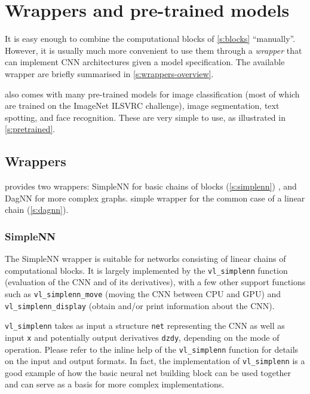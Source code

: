 \chapter{Wrappers and pre-trained models}\label{s:wrappers}

It is easy enough to combine the computational blocks of \autoref{s:blocks} ``manually''. However, it is usually much more convenient to use them through a \emph{wrapper} that can implement CNN architectures given a model specification. The available wrapper are briefly summarised in \autoref{s:wrappers-overview}.

\matconvnet also comes with many pre-trained models for image classification (most of which are trained on the ImageNet ILSVRC challenge), image segmentation, text spotting, and face recognition. These are very simple to use, as illustrated in \autoref{s:pretrained}.

\section{Wrappers}\label{s:wrappers-overview}

\matconvnet provides two wrappers: SimpleNN for basic chains of blocks (\autoref{s:simplenn}) , and DagNN for more complex graphs. simple wrapper for the common case of a linear chain (\autoref{s:dagnn}).  

\subsection{SimpleNN}\label{s:simplenn}

The SimpleNN wrapper is suitable for networks consisting of linear chains of computational blocks.  It is largely implemented by the \verb!vl_simplenn! function (evaluation of the CNN and of its derivatives), with a few other support functions such as \verb!vl_simplenn_move! (moving the CNN between CPU and GPU) and \verb!vl_simplenn_display! (obtain and/or print information about the CNN).

\verb!vl_simplenn! takes as input a structure \verb!net! representing the CNN as well as input \verb!x! and potentially output derivatives \verb!dzdy!, depending on the mode of operation. Please refer to the inline help of the \verb!vl_simplenn! function for details on the input and output formats. In fact, the implementation of \verb!vl_simplenn! is a good example of how the basic neural net building block can be used together and can serve as a basis for more complex implementations.

